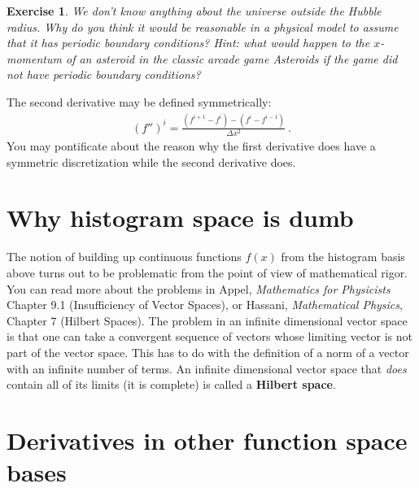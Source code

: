 \documentclass[
  11pt,
	colorful,
	raggedright,
]{tufte-style-thesis-flip}
\newtheorem{exercise}{Exercise}[section]
\begin{document}
\begin{exercise}
We don't know anything about the universe outside the Hubble radius. Why do you think it would be reasonable in a physical model to \emph{assume} that it has periodic boundary conditions? Hint: what would happen to the $x$-momentum of an asteroid in the classic arcade game \emph{Asteroids} if the game did not have periodic boundary conditions? 
\end{exercise}

The second derivative may be defined symmetrically:
\begin{align}
  (f'')^i = \frac{(f^{i+1} - f^i) - (f^i - f^{i-1})}{\Delta x^2} \ .
\end{align}
You may pontificate about the reason why the first derivative does have a symmetric discretization while the second derivative does. 


\section{Why histogram space is dumb}
\label{sec:histogram:space:is:dumb}

The notion of building up continuous functions $f(x)$ from the histogram basis above turns out to be problematic from the point of view of mathematical rigor. You can read more about the problems in Appel, \emph{Mathematics for Physicists} Chapter 9.1 (Insufficiency of Vector Spaces), or Hassani, \emph{Mathematical Physics}, Chapter 7 (Hilbert Spaces). The problem in an infinite dimensional vector space is that one can take a convergent sequence of vectors whose limiting vector is not part of the vector space. This has to do with the definition of a norm of a vector with an infinite number of terms. An infinite dimensional vector space that \emph{does} contain all of its limits (it is complete) is called a \textbf{Hilbert space}.


\section{Derivatives in other function space bases}
\label{sec:derivatives}
\end{document}
